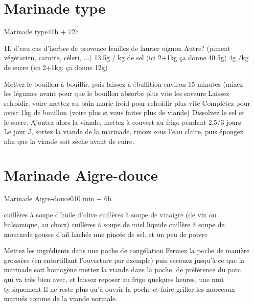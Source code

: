 {\section{Marinade type}
\begin{recette}{Marinade type}{4}{1h + 72h}{}
\begin{ingredients}[2kg de viande]
\ingredient[bouillon]
\ingredient 1L d'eau
 cas d'herbes de provence
 feuilles de laurier
 oignon
\ingredient Autre? (piment végétarien, carotte, céleri, ...)
\ingredient[marinade]
\ingredient 13.5g / kg de sel (ici 2+1kg ça donne 40.5g)
\ingredient 4g /kg de sucre (ici 2+1kg, ça donne 12g)
\ingredient 
\end{ingredients}

\begin{preparation}
\etape Mettez le bouillon à bouillir, puis laissez à ébullition environ 15 minutes (mixez les légumes avant pour que le bouillon absorbe plus vite les saveurs
\etape Laissez refroidir, voire mettez au bain marie froid pour refroidir plus vite
\etape Complétez pour avoir 1kg de bouillon (voire plus si vous faites plus de viande)
\etape Dissolvez le sel et le sucre. 
\etape Ajoutez alors la viande, mettez à couvert au frigo pendant 2.5/3 jours
\etape Le jour J, sortez la viande de la marinade, rincez sous l'eau claire, puis épongez afin que la viande soit sèche avant de cuire. 
\end{preparation}
\end{recette}

\section{Marinade Aigre-douce}
\begin{recette}{Marinade Aigre-douce}{0}{10 min + 6h}{}
\begin{ingredients}
 cuillères à soupe d'huile d'olive
 cuillères à soupe de vinaigre (de vin ou balsamique, au choix)
 cuillères à soupe de miel liquide
 cuillère à soupe de moutarde
 gousse d'ail hachée
\ingredient une pincée de sel, et un peu de poivre
\end{ingredients}

\begin{preparation}
\etape Mettez les ingrédients dans une poche de congélation
\etape Fermez la poche de manière grossière (en entortillant l'ouverture par exemple) puis secouez jusqu'à ce que la marinade 
soit homogène
\etape mettez la viande dans la poche, de préférence du porc qui va très bien avec, et laissez reposer au frigo quelques heures, 
une nuit typiquement
\etape Il ne reste plus qu'à ouvrir la poche et faire griller les morceaux marinés comme de la viande normale.
\end{preparation}
\end{recette}

}
